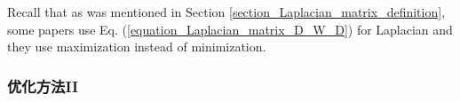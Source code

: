\documentclass[lang=cn,10pt]{gorgeousnbook}
\numberwithin{equation}{section}%
\numberwithin{figure}{section}%
\begin{document}
Recall that as was mentioned in Section \ref{section_Laplacian_matrix_definition}, some papers use Eq. (\ref{equation_Laplacian_matrix_D_W_D}) for Laplacian and they use maximization instead of minimization. 





\subsubsection{优化方法II}
\end{document}
